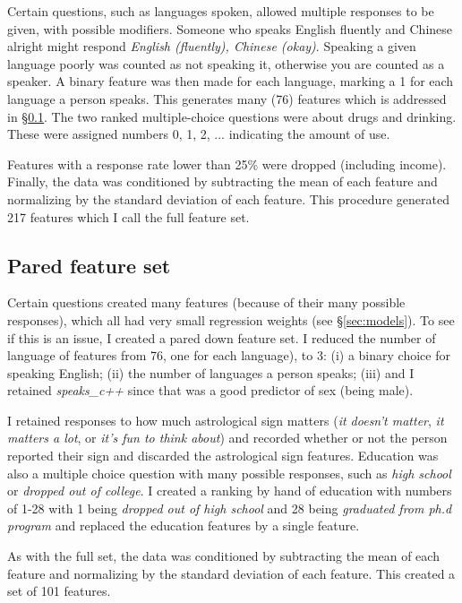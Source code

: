 \documentclass{article} %
\begin{document}
Certain questions, such as languages spoken, allowed multiple responses to be given, with possible modifiers.  Someone who speaks English fluently and Chinese alright might respond \textit{English (fluently), Chinese (okay)}.  Speaking a given language poorly was counted as not speaking it, otherwise you are counted as a speaker.  A binary feature was then made for each language, marking a 1 for each language a person speaks.  This generates many (76) features which is addressed  in \S\ref{sec:pared_features}.  The two ranked multiple-choice questions were about drugs and drinking.  These were assigned numbers 0, 1, 2, ... indicating the amount of use.

Features with a response rate lower than 25\% were dropped (including income).  Finally, the data was conditioned by subtracting the mean of each feature and normalizing by the standard deviation of each feature.  This procedure generated 217 features which I call the full feature set.

\subsection{Pared feature set}
\label{sec:pared_features}

Certain questions created many features (because of their many possible responses), which all had very small regression weights (see \S\ref{sec:models}).  To see if this is an issue, I created a pared down feature set.  I reduced the number of language of features  from 76, one for each language), to 3: (i) a binary choice for speaking English; (ii) the number of languages a person speaks; (iii) and I retained \textit{speaks\_c++} since that was a good predictor of sex (being male).

I retained responses to how much astrological sign matters (\textit{it doesn't matter}, \textit{it matters a lot}, or \textit{it's fun to think about}) and recorded whether or not the person reported their sign and discarded the astrological sign features. Education was also a multiple choice question with many possible responses, such as \textit{high school} or \textit{dropped out of college}.  I created a ranking by hand of education with numbers of 1-28 with 1 being \textit{dropped out of high school} and 28 being \textit{graduated from ph.d program} and replaced the education features by a single feature.

As with the full set, the data was conditioned by subtracting the mean of each feature and normalizing by the standard deviation of each feature.  This created a set of 101 features.
\end{document}
